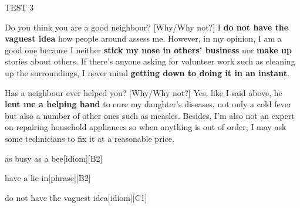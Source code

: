 \begin{glossarymc}[Cambridge 14]
\begin{test}{TEST 3}
    \begin{qa}{Do you think you are a good neighbour? [Why/Why not?]}
    I \textbf{do not have the vaguest idea} how people around assess me. However, in my opinion, I am a good one because I neither \textbf{stick my nose in others’ business} nor \textbf{make up} stories about others. If there’s anyone asking for volunteer work such as cleaning up the surroundings, I never mind \textbf{getting down to doing it in an instant}.
    \end{qa}

    \begin{qa}{Has a neighbour ever helped you? [Why/Why not?]}
    Yes, like I said above, he \textbf{lent me a helping hand} to cure my daughter’s diseases, not only a cold fever but also a number of other ones such as measles. Besides, I’m also not an expert on repairing household appliances so when anything is out of order, I may ask some technicians to fix it at a reasonable price.
    \end{qa}

        \begin{VocabExplain}[Part 1]
            \begin{ExplainCard}{as busy as a bee}[idiom][B2]
            \end{ExplainCard}

            \begin{ExplainCard}{have a lie-in}[phrase][B2]
            \end{ExplainCard}

            \begin{ExplainCard}{do not have the vaguest idea}[idiom][C1]
            \end{ExplainCard}


\end{VocabExplain}
\end{test}
\end{glossarymc}
